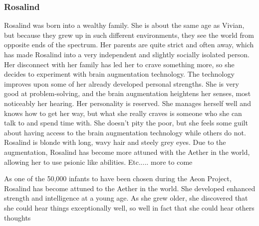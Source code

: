 \documentclass[12pt,titlepage]{article}
\newcommand\tab[1][.5in]{\hspace*{#1}}
\begin{document}
\subsubsection{Rosalind}

\tab Rosalind was born into a wealthy family. She is about the same age as Vivian, 
but because they grew up in such different environments, they see the world from 
opposite ends of the spectrum. Her parents are quite strict and often away, which 
has made Rosalind into a very independent and slightly socially isolated person. 
Her disconnect with her family has led her to crave something more, so she 
decides to experiment with brain augmentation technology. The technology 
improves upon some of her already developed personal strengths. She is very 
good at problem-solving, and the brain augmentation heightens her senses, most 
noticeably her hearing. Her personality is reserved. She manages herself well and 
knows how to get her way, but what she really craves is someone who she can 
talk to and spend time with. She doesn't pity the poor, but she feels some guilt 
about having access to the brain augmentation technology while others do not. 
Rosalind is blonde with long, wavy hair and steely grey eyes. Due to the 
augmentation, Rosalind has become more attuned with the Aether in the world, 
allowing her to use psionic like abilities. Etc..... more to come

As one of the 50,000 infants to have been chosen during the Aeon Project, 
Rosalind has become attuned to the Aether in the world. She developed enhanced 
strength and intelligence at a young age. As she grew older, she discovered that 
she could hear things exceptionally well, so well in fact that she could hear others 
thoughts




\end{document}
